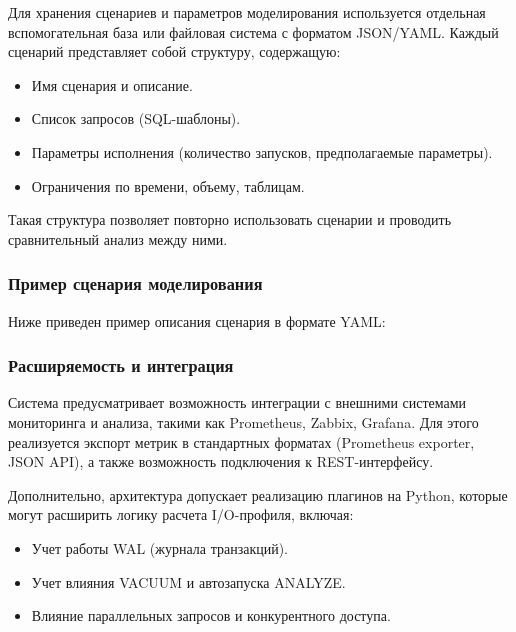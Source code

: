 Для хранения сценариев и параметров моделирования используется отдельная вспомогательная база или файловая система с форматом JSON/YAML. Каждый сценарий представляет собой структуру, содержащую:

\begin{itemize}
\item Имя сценария и описание.
\item Список запросов (SQL-шаблоны).
\item Параметры исполнения (количество запусков, предполагаемые параметры).
\item Ограничения по времени, объему, таблицам.
\end{itemize}

Такая структура позволяет повторно использовать сценарии и проводить сравнительный анализ между ними.

\subsubsection{Пример сценария моделирования}

Ниже приведен пример описания сценария в формате YAML:



\subsubsection{Расширяемость и интеграция}

Система предусматривает возможность интеграции с внешними системами мониторинга и анализа, такими как Prometheus, Zabbix, Grafana. Для этого реализуется экспорт метрик в стандартных форматах (Prometheus exporter, JSON API), а также возможность подключения к REST-интерфейсу.

Дополнительно, архитектура допускает реализацию плагинов на Python, которые могут расширить логику расчета I/O-профиля, включая:

\begin{itemize}
\item Учет работы WAL (журнала транзакций).
\item Учет влияния VACUUM и автозапуска ANALYZE.
\item Влияние параллельных запросов и конкурентного доступа.
\end{itemize}

